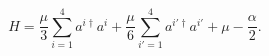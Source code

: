 \begin{equation}\label{norH}
H = \frac{\mu}3 \sum_{i=1}^4 a^{i \dagger} a^i
    + \frac{\mu}6 \sum_{i'=1}^4 a^{i' \dagger} a^{i'}
    + \mu - \frac{\alpha}{2}.
\end{equation}


